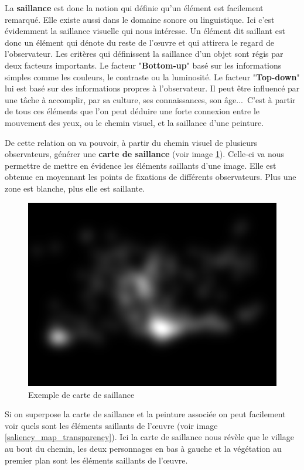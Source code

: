 \par
La \textbf{saillance} est donc la notion qui définie qu'un élément est facilement remarqué\cite{saillance}. Elle existe aussi dans le domaine sonore ou linguistique. Ici c'est évidemment la saillance visuelle qui nous intéresse. Un élément dit saillant est donc un élément qui dénote du reste de l'\oe{}uvre et qui attirera le regard de l'observateur. Les critères qui définissent la saillance d'un objet sont régis par deux facteurs importants. Le facteur "\textbf{Bottom-up}" basé sur les informations simples comme les couleurs, le contraste ou la luminosité. Le facteur "\textbf{Top-down}" lui est basé sur des informations propres à l'observateur. Il peut être influencé par une tâche à accomplir, par sa culture, ses connaissances, son âge...\ C'est à partir de tous ces éléments que l'on peut déduire une forte connexion entre le mouvement des yeux, ou le chemin visuel, et la saillance d'une peinture.

\par
De cette relation on va pouvoir, à partir du chemin visuel de plusieurs observateurs, générer une \textbf{carte de saillance} (voir image \ref{ex_saliency_map}). Celle-ci va nous permettre de mettre en évidence les éléments saillants d'une image. Elle est obtenue en moyennant les points de fixations de différents observateurs. Plus une zone est blanche, plus elle est saillante.

\begin{figure}[!ht]
    \centering
    \includegraphics[width=0.7\linewidth]{datas/exemple_saliency_map.png}
    \caption{Exemple de carte de saillance}
    \label{ex_saliency_map}
\end{figure}

\par
Si on superpose la carte de saillance et la peinture associée on peut facilement voir quels sont les éléments saillants de l'\oe{}uvre (voir image \ref{saliency_map_transparency}). Ici la carte de saillance nous révèle que le village au bout du chemin, les deux personnages en bas à gauche et la végétation au premier plan sont les éléments saillants de l'\oe{}uvre.

